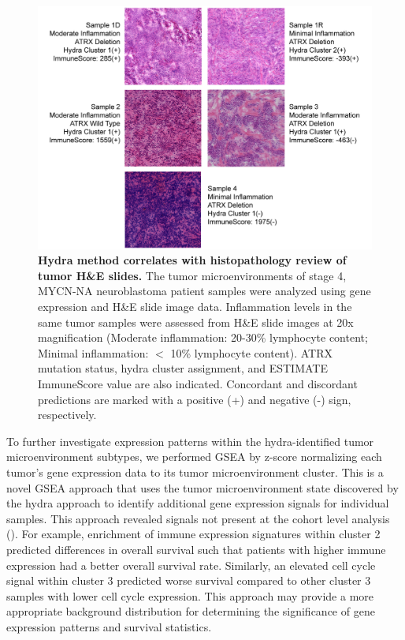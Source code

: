 \documentclass[10pt,letterpaper]{article}
\begin{document}
\begin{figure}[!h]
	\includegraphics[width=\textwidth]{img/NBL-MYCN-NA-HE-2x}
	\caption{{\bf Hydra method correlates with histopathology review of tumor H\&E slides.}
		The tumor microenvironments of stage 4, MYCN-NA neuroblastoma patient samples were analyzed using gene expression and H\&E slide image data. Inflammation levels in the same tumor samples were assessed from H\&E slide images at 20x magnification (Moderate inflammation: 20-30\% lymphocyte content; Minimal inflammation: $<$ 10\% lymphocyte content). ATRX mutation status, hydra cluster assignment, and ESTIMATE ImmuneScore value are also indicated. Concordant and discordant predictions are marked with a positive (+) and negative (-) sign, respectively.}
	\label{hefig}
\end{figure}

To further investigate expression patterns within the hydra-identified tumor microenvironment subtypes, we performed GSEA by z-score normalizing each tumor’s gene expression data to its tumor microenvironment cluster. This is a novel GSEA approach that uses the tumor microenvironment state discovered by the hydra approach to identify additional gene expression signals for individual samples. This approach revealed signals not present at the cohort level analysis (). For example, enrichment of immune expression signatures within cluster 2 predicted differences in overall survival such that patients with higher immune expression had a better overall survival rate. Similarly, an elevated cell cycle signal within cluster 3 predicted worse survival compared to other cluster 3 samples with lower cell cycle expression. This approach may provide a more appropriate background distribution for determining the significance of gene expression patterns and survival statistics.
\end{document}
